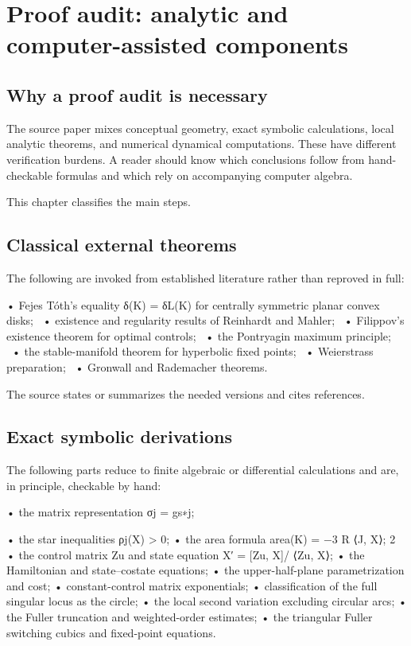 \chapter{Proof audit: analytic and computer-assisted components}
\section{Why a proof audit is necessary}

The source paper mixes conceptual geometry, exact symbolic calculations, local analytic theorems, and numerical dynamical computations. These have different verification burdens. A reader should know which conclusions follow from hand-checkable formulas and which rely on accompanying computer algebra.


This chapter classifies the main steps.


\section{Classical external theorems}

The following are invoked from established literature rather than reproved in full:


\begin{displaytext}
• Fejes Tóth’s equality δ(K) = δL(K) for centrally symmetric planar convex disks; \
• existence and regularity results of Reinhardt and Mahler; \
• Filippov’s existence theorem for optimal controls; \
• the Pontryagin maximum principle; \
• the stable-manifold theorem for hyperbolic fixed points; \
• Weierstrass preparation; \
• Gronwall and Rademacher theorems.
\end{displaytext}

The source states or summarizes the needed versions and cites references.


\section{Exact symbolic derivations}

The following parts reduce to finite algebraic or differential calculations and are, in principle, checkable by hand:


\begin{displaytext}
• the matrix representation σj = gs∗j;
\end{displaytext}

• the star inequalities ρj(X) > 0; • the area formula area(K) = −3 R ⟨J, X⟩; 2 • the control matrix Zu and state equation X′ = [Zu, X]/ ⟨Zu, X⟩; • the Hamiltonian and state–costate equations; • the upper-half-plane parametrization and cost; • constant-control matrix exponentials; • classification of the full singular locus as the circle; • the local second variation excluding circular arcs; • the Fuller truncation and weighted-order estimates; • the triangular Fuller switching cubics and fixed-point equations.


